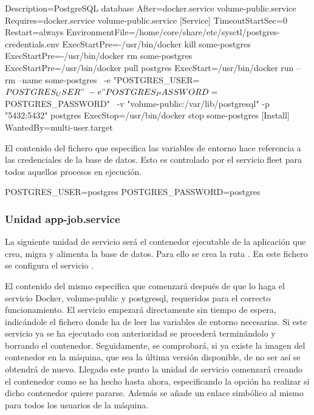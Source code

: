 \begin{codelisting}
\label{code:postgresql.service}
\begin{code}
[Unit] 
  Description=PostgreSQL database 
  After=docker.service volume-public.service
  Requires=docker.service volume-public.service
[Service] 
  TimeoutStartSec=0
  Restart=always
  EnvironmentFile=/home/core/share/etc/sysctl/postgres-credentials.env
  ExecStartPre=-/usr/bin/docker kill some-postgres 
  ExecStartPre=-/usr/bin/docker rm some-postgres 
  ExecStartPre=/usr/bin/docker pull postgres 
  ExecStart=/usr/bin/docker run --rm --name some-postgres \
  -e "POSTGRES_USER=${POSTGRES_USER}" \
  -e "POSTGRES_PASSWORD=${POSTGRES_PASSWORD}" \
  -v "volume-public:/var/lib/postgresql" -p "5432:5432" postgres 
  ExecStop=/usr/bin/docker stop some-postgres 
[Install] 
  WantedBy=multi-user.target
\end{code}
\end{codelisting}

El contenido del fichero que especifica las variables de entorno hace referencia a las credenciales de la base de datos. Esto es controlado por el servicio fleet para todos aquellos procesos en ejecución.

\begin{codelisting}
\label{code:credentials}
\begin{code}
POSTGRES_USER=postgres
POSTGRES_PASSWORD=postgres
\end{code}
\end{codelisting}

\subsubsection{Unidad app-job.service}

La siguiente unidad de servicio será el contenedor ejecutable de la aplicación que crea, migra y alimenta la base de datos. Para ello se crea la ruta . En este fichero se configura el servicio .

El contenido del mismo especifica que comenzará después de que lo haga el servicio Docker, volume-public y postgresql, requeridos para el correcto funcionamiento. El servicio empezará directamente sin tiempo de espera, indicándole el fichero donde ha de leer las variables de entorno necesarias. Si este servicio ya se ha ejecutado con anterioridad se procederá terminándolo y borrando el contenedor. Seguidamente, se comprobará, si ya existe la imagen del contenedor en la máquina, que sea la última versión disponible, de no ser así se obtendrá de nuevo. Llegado este punto la unidad de servicio comenzará creando el contenedor como se ha hecho hasta ahora, especificando la opción ha realizar si dicho contenedor quiere pararse. Además se añade un enlace simbólico al mismo para todos los usuarios de la máquina. 

